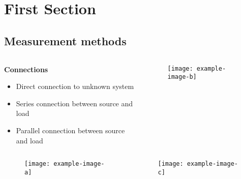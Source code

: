 \documentclass{beamer}
\begin{document}
\section{First Section} 

\subsection{Measurement methods}
\begin{frame}

\begin{columns}[T,onlytextwidth]
    \begin{column}{.48\textwidth}
      \textbf{Connections}
      \begin{itemize}
          \item Direct connection to unknown system
          \item Series connection between source and load
          \item Parallel connection between source and load 
      \end{itemize}
    \end{column}
    \begin{column}{.48\textwidth}
    \begin{figure}
         \centering
         \texttt{[image: example-image-b]}
        \caption{}
        \label{fig:voltage}
    \end{figure}        
    \end{column}
\end{columns}

\begin{columns}[b,onlytextwidth]
    \begin{column}{.48\textwidth}
    \begin{figure}
         \centering
         \texttt{[image: example-image-a]}
        \caption{}
        \label{fig:imu}
    \end{figure}
    \end{column}
    \begin{column}{.48\textwidth}
    \begin{figure}
         \centering
         \texttt{[image: example-image-c]}
        \caption{}
        \label{fig:current}
    \end{figure}        
    \end{column}
\end{columns}

\end{frame}
\end{document}
